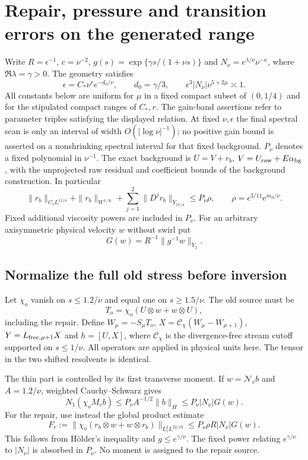 \section{Repair, pressure and transition errors on the generated range}

Write $R=\epsilon^{-1}$, $c=\nu^{-2}$,
$g(s)=\exp\{\gamma s/(1+\nu s)\}$ and
$N_\nu=e^{\lambda/\nu}\nu^{-\kappa}$, where $\Re\lambda=\gamma>0$.
The geometry satisfies
\[
 \epsilon=C_*\nu^r e^{-d_0/\nu},\qquad d_0=\gamma/3,
 \qquad \epsilon^3|N_\nu|\nu^{5+2\mu}\asymp1.
\]
All constants below are uniform for $\mu$ in a fixed compact subset
of $(0,1/4)$ and for the stipulated compact ranges of $C_*,r$.
The gain-band assertions refer to parameter triples satisfying the
displayed relation. At fixed $\nu,\epsilon$ the final spectral scan
is only an interval of width $O(|\log\nu|^{-1})$; no positive gain
bound is asserted on a nonshrinking spectral interval for that fixed
background.
$P_\nu$ denotes a fixed polynomial in $\nu^{-1}$. The exact
background is $U=V+r_b$, $V=U_{\rm raw}+E\alpha_{\rm bg}$, with the unprojected raw residual and
coefficient bounds of the background construction. In particular
\[
 \|r_b\|_{C_\tau L^{11/4}}+\|r_b\|_{W^{1,\infty}}
  +\sum_{j=1}^2\|D^jr_b\|_{Y_{11/4}}
 \le P_\nu\rho,\qquad
 \rho=\epsilon^{3/11}e^{m_0/\nu}.
\]
Fixed additional viscosity powers are included in $P_\nu$.
For an arbitrary axisymmetric physical velocity $w$ without swirl put
\[
 G(w)=R^{-1}\|g^{-1}w\|_{Y_2}.
\]

\subsection{Normalize the full old stress before inversion}

Let $\chi_o$ vanish on $s\le1.2/\nu$ and equal one on
$s\ge1.5/\nu$. The old source must be
\[
 T_o=\chi_o(U\otimes w+w\otimes U),
\]
including the repair. Define $W_\mu=-S_\mu T_o$,
$X=\mathcal C_\chi(W_\mu-W_{\mu+1})$,
$Y=L_{{\rm free},\mu+1}X$ and $h=[U,X]$, where
$\mathcal C_\chi$ is the divergence-free stream cutoff supported on
$s\le1/\nu$. All operators are applied in physical units here.
The tensor in the two shifted resolvents is identical.

The thin part is controlled by its first transverse moment. If
$w=\mathcal N_v b$ and $A=1.2/\nu$, weighted Cauchy--Schwarz gives
\[
 N_1(\chi_o M_vb)
 \le P_\nu A^{-1/2}\|b\|_H
 \le P_\nu |N_\nu|G(w).
\]
For the repair, use instead the global product estimate
\begin{equation}\label{repair:source}
 F_r:=\|\chi_o(r_b\otimes w+w\otimes r_b)\|_{L^2_\tau L^{22/19}}
 \le P_\nu\rho R|N_\nu|G(w).
\end{equation}
This follows from H\"older's inequality and $g\le e^{\gamma/\nu}$.
The fixed power relating $e^{\gamma/\nu}$ to $|N_\nu|$ is absorbed
in $P_\nu$. No moment is assigned to the repair source.

